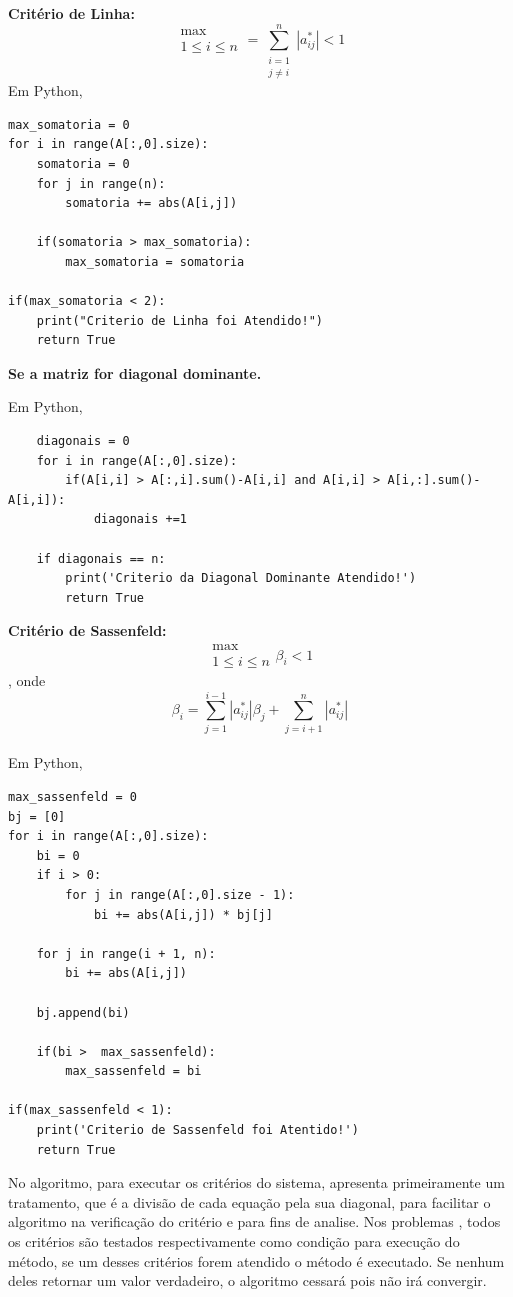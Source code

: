 \documentclass[
	12pt,				%
	openright,			%
	twoside,			%
	a4paper,			%
	english,			%
	french,				%
	spanish,			%
	brazil				%
	]{abntex2_new}
\begin{document}
\begin{alineas}
\item{\textbf{Critério de Linha:}
$$\substack{\max \\ 1 \leq i \leq n} = \sum_{\substack{i = 1 \\ j \neq i}}^{n} |a_{ij}^{*} | < 1 $$
Em Python,
\begin{lstlisting}
max_somatoria = 0
for i in range(A[:,0].size):
	somatoria = 0
	for j in range(n):
		somatoria += abs(A[i,j])

	if(somatoria > max_somatoria):
		max_somatoria = somatoria

if(max_somatoria < 2): 
	print("Criterio de Linha foi Atendido!")
	return True\end{lstlisting}
}

\item{\textbf{Se a matriz for diagonal dominante.}
	
	Em Python,
	\begin{lstlisting}
	diagonais = 0
	for i in range(A[:,0].size):
		if(A[i,i] > A[:,i].sum()-A[i,i] and A[i,i] > A[i,:].sum()-A[i,i]):
			diagonais +=1

	if diagonais == n:
		print('Criterio da Diagonal Dominante Atendido!')
		return True
	\end{lstlisting}
	


}
\item{\textbf{Critério de Sassenfeld:}
$$\substack{\max \\ 1 \leq i \leq n}  \beta_i < 1 $$\hspace{25pt}, onde
$$\beta_i = \sum_{j=1}^{i-1} |a_{ij}^{*} | \beta_j + \sum_{j = i + 1}^{n}  | a_{ij}^{*}|$$\\

Em Python,
\begin{lstlisting}
max_sassenfeld = 0
bj = [0]
for i in range(A[:,0].size):
	bi = 0
	if i > 0:
		for j in range(A[:,0].size - 1):
			bi += abs(A[i,j]) * bj[j]

	for j in range(i + 1, n):
		bi += abs(A[i,j])

	bj.append(bi)

	if(bi >  max_sassenfeld):
		max_sassenfeld = bi

if(max_sassenfeld < 1):
	print('Criterio de Sassenfeld foi Atentido!')
	return True\end{lstlisting}  
}
\end{alineas}

No algoritmo, para executar os critérios do sistema, apresenta 
primeiramente um tratamento, que é a divisão de cada equação pela sua diagonal, para
facilitar o algoritmo na verificação do critério e para fins de analise.
Nos problemas , todos os critérios são testados respectivamente como condição para
execução do método, se um desses critérios forem atendido o método é executado.
Se nenhum deles retornar um valor verdadeiro, o algoritmo cessará pois não irá
convergir.
\end{document}
